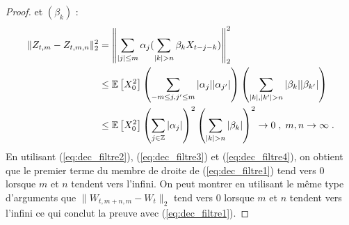 \begin{proof}
et $(\beta_k)$ :
\begin{align}\label{eq:dec_filtre4}
\|Z_{t,m}-Z_{t,m,n}\|_2^2&=\left\|\sum_{|j|\leq
  m}\alpha_j(\sum_{|k|>n}\beta_k X_{t-j-k})\right\|_2^2\\
&\leq \PE{X_0^2}\left(\sum_{-m\leq j,j'\leq m}|\alpha_j| |\alpha_{j'}|\right)
\left(\sum_{|k|,|k'|>n} |\beta_k||\beta_{k'}|\right)\\
&\leq \PE{X_0^2} \left(\sum_{j\in\Zset}|\alpha_j|\right)^2
\left(\sum_{|k|>n}|\beta_k|\right)^2\to 0\;,\; m,n\to\infty\;.
\end{align}
En utilisant (\ref{eq:dec_filtre2}), (\ref{eq:dec_filtre3}) et
(\ref{eq:dec_filtre4}), on obtient que le premier terme du membre de
droite de (\ref{eq:dec_filtre1}) tend vers 0 lorsque $m$ et $n$
tendent vers l'infini.
On peut montrer en utilisant le m\^{e}me type d'arguments que
$\|W_{t,m+n,m}-W_t\|_2$
tend vers 0 lorsque $m$ et $n$ tendent vers l'infini ce qui conclut la
preuve avec (\ref{eq:dec_filtre1}).

\end{proof}


